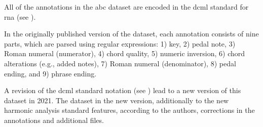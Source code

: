 
All of the annotations in the \gls{abc} dataset are encoded
in the \gls{dcml} standard for \gls{rna} (see
).


In the originally published version of the dataset, each
annotation consists of nine parts, which are parsed using
regular expressions: 1) key, 2) pedal note, 3) Roman numeral
(numerator), 4) chord quality, 5) numeric inversion, 6)
chord alterations (e.g., added notes), 7) Roman numeral
(denominator), 8) pedal ending, and 9) phrase ending.


A revision of the \gls{dcml} standard notation (see
) lead to a new version of this
dataset in 2021. The dataset in the new version,
additionally to the new harmonic analysis standard features,
according to the authors, corrections in the annotations and
additional files.